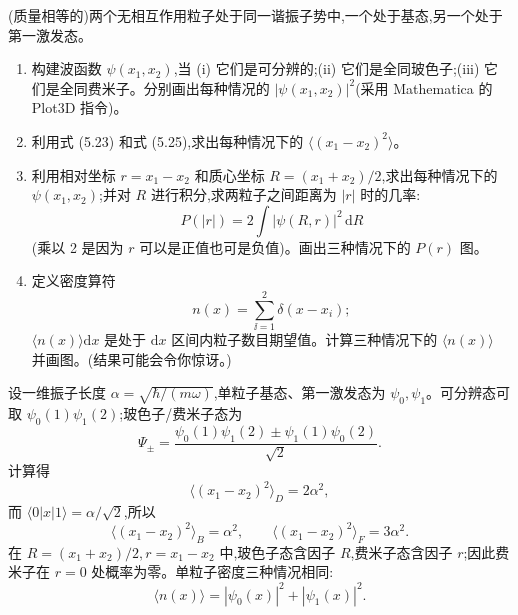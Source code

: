 \begin{question}
(质量相等的)两个无相互作用粒子处于同一谐振子势中,一个处于基态,另一个处于第一激发态。
\begin{enumerate}
\item 构建波函数 $\psi(x_1,x_2)$,当 (i) 它们是可分辨的;(ii) 它们是全同玻色子;(iii) 它们是全同费米子。分别画出每种情况的 $|\psi(x_1,x_2)|^2$(采用 Mathematica 的 Plot3D 指令)。
\item 利用式 (5.23) 和式 (5.25),求出每种情况下的 $\langle (x_1-x_2)^2\rangle$。
\item 利用相对坐标 $r=x_1-x_2$ 和质心坐标 $R=(x_1+x_2)/2$,求出每种情况下的 $\psi(x_1,x_2)$;并对 $R$ 进行积分,求两粒子之间距离为 $|r|$ 时的几率:
\[
P(|r|)=2\int |\psi(R,r)|^2\,\mathrm dR
\]
(乘以 2 是因为 $r$ 可以是正值也可是负值)。画出三种情况下的 $P(r)$ 图。
\item 定义密度算符
\[
n(x)=\sum_{\ii=1}^{2}\delta(x-x_i);
\]
$\langle n(x)\rangle\mathrm dx$ 是处于 $\mathrm dx$ 区间内粒子数目期望值。计算三种情况下的 $\langle n(x)\rangle$ 并画图。(结果可能会令你惊讶。)
\end{enumerate}

\par\smallskip
{}

\begin{solution}

设一维振子长度 $\alpha=\sqrt{\hbar/(m\omega)}$,单粒子基态、第一激发态为 $\psi_0,\psi_1$。可分辨态可取 $\psi_0(1)\psi_1(2)$;玻色子/费米子态为
\[
\Psi_\pm=\frac{\psi_0(1)\psi_1(2)\pm\psi_1(1)\psi_0(2)}{\sqrt2}.
\]
计算得
\[
\langle(x_1-x_2)^2\rangle_D=2\alpha^2,
\]
而 $\langle0|x|1\rangle=\alpha/\sqrt2$,所以
\[
\langle(x_1-x_2)^2\rangle_B=\alpha^2,
\qquad
\langle(x_1-x_2)^2\rangle_F=3\alpha^2.
\]
在 $R=(x_1+x_2)/2,r=x_1-x_2$ 中,玻色子态含因子 $R$,费米子态含因子 $r$;因此费米子在 $r=0$ 处概率为零。单粒子密度三种情况相同:
\[
\langle n(x)\rangle=|\psi_0(x)|^2+|\psi_1(x)|^2.
\]

\end{solution}
\end{question}


